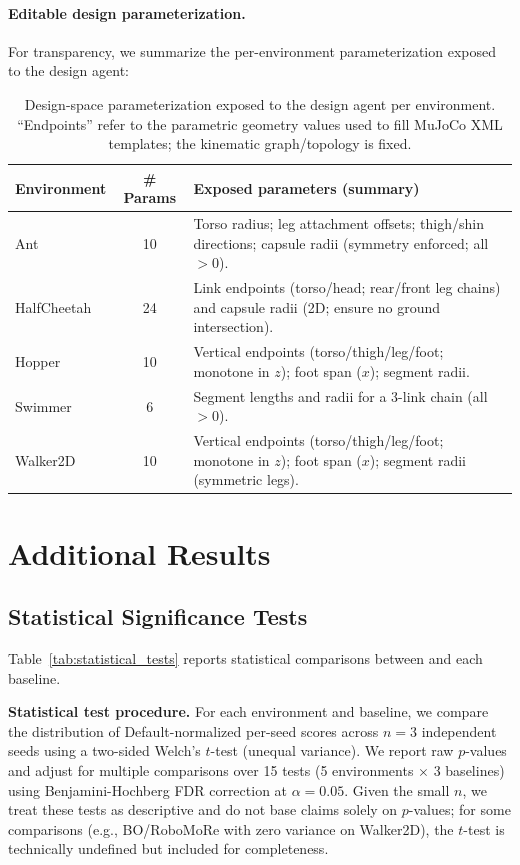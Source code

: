 \paragraph{Editable design parameterization.}
For transparency, we summarize the per-environment parameterization exposed to the design agent:
\begin{table}[htbp]
\centering
\caption{Design-space parameterization exposed to the design agent per environment. ``Endpoints'' refer to the parametric geometry values used to fill MuJoCo XML templates; the kinematic graph/topology is fixed.}
\label{tab:design_parameterization}
\small
\setlength{\tabcolsep}{4pt}
\begin{tabular}{@{}lcl@{}}
\toprule
Environment & \# Params & Exposed parameters (summary) \\
\midrule
Ant & 10 & Torso radius; leg attachment offsets; thigh/shin directions; capsule radii (symmetry enforced; all $>0$). \\
HalfCheetah & 24 & Link endpoints (torso/head; rear/front leg chains) and capsule radii (2D; ensure no ground intersection). \\
Hopper & 10 & Vertical endpoints (torso/thigh/leg/foot; monotone in $z$); foot span ($x$); segment radii. \\
Swimmer & 6 & Segment lengths and radii for a 3-link chain (all $>0$). \\
Walker2D & 10 & Vertical endpoints (torso/thigh/leg/foot; monotone in $z$); foot span ($x$); segment radii (symmetric legs). \\
\bottomrule
\end{tabular}
\end{table}

\section{Additional Results}
\label{app:additional_results}

\subsection{Statistical Significance Tests}
\label{app:statistical_tests}

Table~\ref{tab:statistical_tests} reports statistical comparisons between \abbrev{} and each baseline.

\textbf{Statistical test procedure.} For each environment and baseline, we compare the distribution of Default-normalized per-seed scores across $n{=}3$ independent seeds using a two-sided Welch's $t$-test (unequal variance). We report raw $p$-values and adjust for multiple comparisons over 15 tests (5 environments $\times$ 3 baselines) using Benjamini-Hochberg FDR correction at $\alpha = 0.05$. Given the small $n$, we treat these tests as descriptive and do not base claims solely on $p$-values; for some comparisons (e.g., BO/RoboMoRe with zero variance on Walker2D), the $t$-test is technically undefined but included for completeness.


